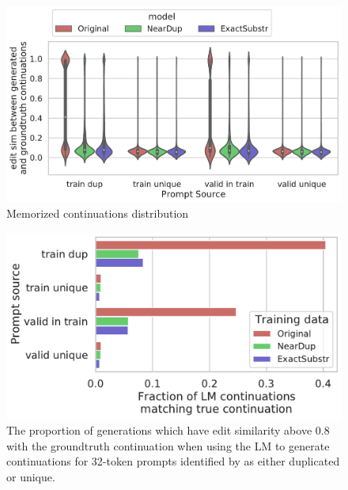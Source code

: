 

\begin{figure}
    \centering
    \includegraphics[width=\linewidth]{figures/memorized_continuations_distribution.pdf}
    \caption{Memorized continuations distribution}
    \label{fig:mem-cont-dist}
\end{figure}

\begin{figure}
    \centering
    \small
    \includegraphics[width=0.6\linewidth]{figures/memorized_continuations_fraction}
    \caption{The proportion of generations which have edit similarity above 0.8 with the groundtruth continuation when using the LM to generate continuations for 32-token prompts identified by \Approx{} as either duplicated or unique.}
    \label{fig:ground-truth-continuation}
\end{figure}

